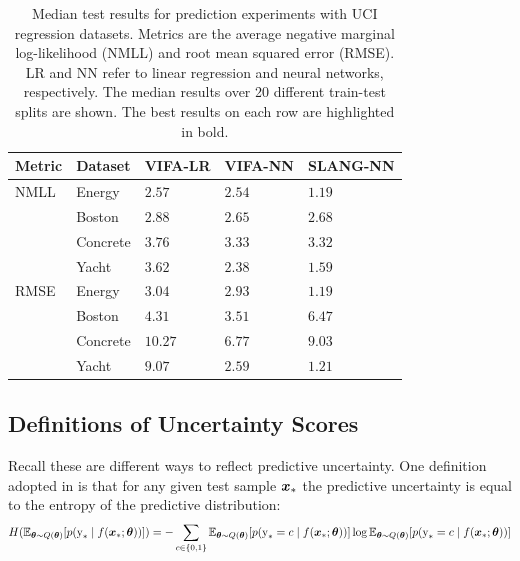 \documentclass[10pt]{article} %
\begin{document}
\begin{table}[!h]
\caption{Median test results for prediction experiments with UCI regression datasets. Metrics are the average negative marginal log-likelihood (NMLL) and root mean squared error (RMSE). LR and NN refer to linear regression and neural networks, respectively. The median results over 20 different train-test splits are shown. The best results on each row are highlighted in bold.}
\label{table:neural_nets_uci_median}
\begin{center}
\begin{tabular}{l|llll}
\textbf{Metric} & \textbf{Dataset} & \textbf{VIFA-LR} & \textbf{VIFA-NN} & \textbf{SLANG-NN} \\ \hline
NMLL 	& Energy 		& $2.57$ 					& $2.54$ 					& $\mathbf{1.19}$ \\ 	
		& Boston   	& $2.88$	 				& $\mathbf{2.65}$ 			& $2.68$ \\ 			
		& Concrete	& $3.76$ 					& $3.33$ 					& $\mathbf{3.32}$ \\ 			
 	& Yacht    		& $3.62$ 					& $2.38$ 					& $\mathbf{1.59}$ \\ \hline
RMSE 	& Energy 	 	& $3.04$ 					& $2.93$ 					& $\mathbf{1.19}$ \\ 
		& Boston 	 	& $4.31$ 					& $\mathbf{3.51}$ 			& $6.47$ \\ 
		& Concrete  	& $10.27$ 				& $\mathbf{6.77}$ 			& $9.03$ \\ 
 	& Yacht 		& $9.07$ 					& $2.59$ 					& $\mathbf{1.21}$ \\ 
\end{tabular}
\end{center}
\end{table}

\subsection{Definitions of Uncertainty Scores}\label{app:uncertainty_scores_defs}
Recall these are different ways to reflect predictive uncertainty. One definition adopted in \citet{band2022benchmarking} is that for any given test sample ${\bm{x}}_*$ the predictive uncertainty is equal to the entropy of the predictive distribution: 
\begin{equation}
H(\mathbb{E}_{{\bm{\theta}} \sim Q({\bm{\theta}})}[p({\textnormal{y}}_* \mid f({\bm{x}}_* ; {\bm{\theta}}))])=-\sum_{c \in\{0,1\}} \mathbb{E}_{{\bm{\theta}} \sim Q({\bm{\theta}})}[p({\textnormal{y}}_*=c \mid f({\bm{x}}_* ; {\bm{\theta}}))] \log \mathbb{E}_{{\bm{\theta}} \sim Q({\bm{\theta}})} [p({\textnormal{y}}_*=c \mid f({\bm{x}}_* ; {\bm{\theta}}))]
\end{equation}
\end{document}
